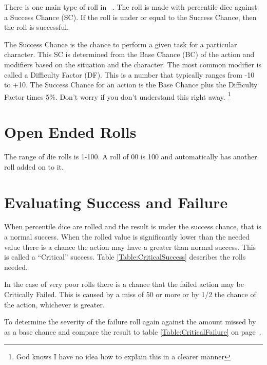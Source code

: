 There is one main type of roll in \SH\ . The roll is 
made with percentile dice against a Success Chance (SC). If the roll 
is under or equal to the Success Chance, then the roll is successful.

The Success Chance is the chance to perform a given task for a particular
character. This SC is determined from the Base Chance (BC) of the action 
and modifiers based on the situation and the character. The most common 
modifier is called a Difficulty Factor (DF). This is a number that typically 
ranges from -10 to +10. The Success Chance for an action is the Base Chance plus 
the Difficulty Factor times 5\%. Don't worry if you don't understand 
this right away. \footnote{God knows I have no idea how to explain 
this in a clearer manner}

\section{Open Ended Rolls}

The range of die rolls is 1-100. A roll of 00 is 100 and 
automatically has another roll added on to it.

\section{Evaluating Success and Failure}

When percentile dice are rolled and the result is under the success chance, that
is a normal success. When the rolled value is significantly lower than the needed 
value there is a chance the action may have a greater than normal success. This is 
called a ``Critical'' success. Table \ref{Table:CriticalSuccess} describes the 
rolls needed.



In the case of very poor rolls there is a chance that the failed action 
may be Critically Failed. This is caused by a miss of 50 or more or by 
1/2 the chance of the action, whichever is greater.

To determine the severity of the failure roll again against the 
amount missed by as a base chance and compare the result to table 
\ref{Table:CriticalFailure} on page~\pageref{Table:CriticalFailure}.


